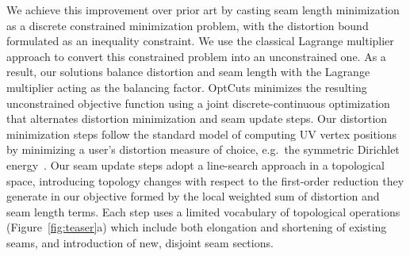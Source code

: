 We achieve this improvement over prior art by casting seam length minimization as a discrete constrained minimization problem, with the distortion bound formulated as an inequality constraint. 
We use the classical Lagrange multiplier approach to convert this constrained problem into an unconstrained one. As a result, our solutions balance distortion and seam length
with the Lagrange multiplier acting as the balancing factor.
OptCuts minimizes the resulting unconstrained objective function using a joint discrete-continuous optimization that alternates distortion minimization and seam update steps.
Our distortion minimization steps follow the standard model of computing UV vertex positions by minimizing a user's distortion measure of choice, e.g.\ the symmetric Dirichlet energy~\cite{Smith2015Bijective}. Our seam update steps adopt a line-search approach in a topological space, introducing topology changes with respect to the first-order reduction they generate in our objective formed by the local weighted sum of distortion and seam length terms. Each step uses a limited vocabulary of topological operations (Figure~\ref{fig:teaser}a) which include both elongation and shortening of existing seams, and introduction of new, disjoint seam sections. 

%

